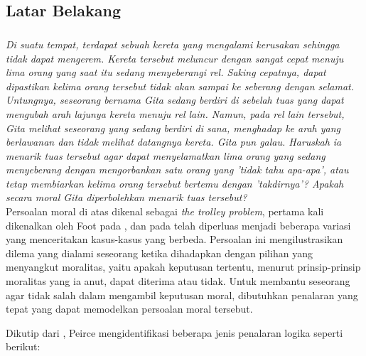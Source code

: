 \chapter{\babSatu}


\section{Latar Belakang}

\paragraph{}
\textit{Di suatu tempat, terdapat sebuah kereta yang mengalami kerusakan sehingga tidak dapat mengerem. Kereta tersebut meluncur dengan sangat cepat menuju lima orang yang saat itu sedang menyeberangi rel. Saking cepatnya, dapat dipastikan kelima orang tersebut tidak akan sampai ke seberang dengan selamat. Untungnya, seseorang bernama Gita sedang berdiri di sebelah tuas yang dapat mengubah arah lajunya kereta menuju rel lain. Namun, pada rel lain tersebut, Gita melihat seseorang yang sedang berdiri di sana, menghadap ke arah yang berlawanan dan tidak melihat datangnya kereta. Gita pun galau. Haruskah ia menarik tuas tersebut agar dapat menyelamatkan lima orang yang sedang menyeberang dengan mengorbankan satu orang yang 'tidak tahu apa-apa', atau tetap membiarkan kelima orang tersebut bertemu dengan 'takdirnya'? Apakah secara moral Gita diperbolehkan menarik tuas tersebut? }
\\

Persoalan moral di atas dikenal sebagai \textit{the trolley problem}, pertama kali dikenalkan oleh Foot pada \cite{foot1967problem}, dan pada \cite{mikhail2007universal} telah diperluas menjadi beberapa variasi yang menceritakan kasus-kasus yang berbeda. Persoalan ini mengilustrasikan dilema yang dialami seseorang ketika dihadapkan dengan pilihan yang menyangkut moralitas, yaitu apakah keputusan tertentu, menurut prinsip-prinsip moralitas yang ia anut, dapat diterima atau tidak. Untuk membantu seseorang agar tidak salah dalam mengambil keputusan moral, dibutuhkan penalaran yang tepat yang dapat memodelkan persoalan moral tersebut.

Dikutip dari \cite{burks1946peirce}, Peirce mengidentifikasi beberapa jenis penalaran logika seperti berikut:

